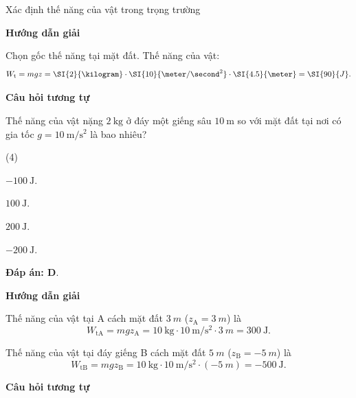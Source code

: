 \begin{dang}{Xác định thế năng của vật trong trọng trường}
	{	\begin{center}
			\textbf{Hướng dẫn giải}
		\end{center}
		Chọn gốc thế năng tại mặt đất. Thế năng của vật:
		$$W_\text t = mgz = \SI{2}{\kilogram}\cdot\SI{10}{\meter/\second^2}\cdot\SI{4.5}{\meter}=\SI{90}{J}.$$
		
		\begin{center}
			\textbf{Câu hỏi tương tự}
		\end{center}
		
		Thế năng của vật nặng $\SI{2}{\kilogram}$ ở đáy một giếng sâu $\SI{10}{\meter}$ so với mặt đất tại nơi có gia tốc $g= \SI{10}{\meter/\second^2}$ là bao nhiêu?
		\begin{mcq}(4)
			\item $\SI{-100}{\joule}$.
			\item $\SI{100}{\joule}$.
			\item $\SI{200}{\joule}$.
			\item $\SI{-200}{\joule}$. 
		\end{mcq}
		
		\textbf{Đáp án: D}.
	}
	{	\begin{center}
			\textbf{Hướng dẫn giải}
		\end{center}
		
		Thế năng của vật tại A cách mặt đất $\SI{3}{m}$ ($z_\text{A}=\SI{3}{m}$) là
		\begin{equation*}
			W_{\text{tA}}=mgz_\text{A}=\SI{10}{\kilogram}\cdot\SI{10}{\meter/\second^2}\cdot\SI{3}{m}=\SI{300}{\joule}.
		\end{equation*}
		
		Thế năng của vật tại đáy giếng B cách mặt đất $\SI{5}{m}$ ($z_\text{B}=-\SI{5}{m}$) là
		\begin{equation*}
			W_{\text{tB}}=mgz_\text{B}=\SI{10}{\kilogram}\cdot\SI{10}{\meter/\second^2}\cdot(-\SI{5}{m})=\SI{-500}{\joule}.
		\end{equation*}
		
		
		\begin{center}
			\textbf{Câu hỏi tương tự}
		\end{center}
		
}
\end{dang}

